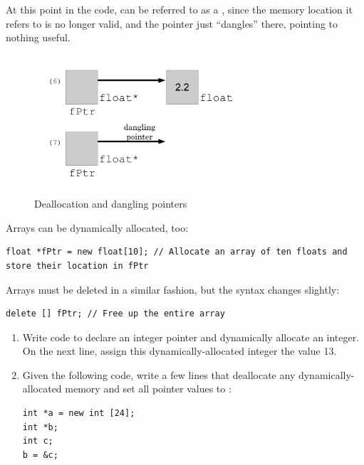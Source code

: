 At this point in the code,  can be referred to as a , since the memory location it refers to is no longer valid, and the pointer just ``dangles'' there, pointing to nothing useful. 

\begin{figure}[tbh]
  \centering
  \includegraphics[width=0.7\textwidth]{diagrams/new_operator_diagram_3.pdf}
  \caption{Deallocation and dangling pointers} \label{fig:new_operator_diagram_3} 
\end{figure}
Arrays can be dynamically allocated, too:

\noindent\begin{minipage}{\linewidth}\begin{lstlisting}
float *fPtr = new float[10]; // Allocate an array of ten floats and store their location in fPtr
\end{lstlisting}\end{minipage}

Arrays must be deleted in a similar fashion, but the syntax changes slightly:

\noindent\begin{minipage}{\linewidth}\begin{lstlisting}
delete [] fPtr; // Free up the entire array
\end{lstlisting}\end{minipage}



\begin{enumerate}
	\item Write code to declare an integer pointer and dynamically allocate an integer. On the next line, assign this dynamically-allocated integer the value 13.

  \item Given the following code, write a few lines that deallocate any dynamically-allocated memory and set all pointer values to :

\noindent\begin{minipage}{\linewidth}\begin{lstlisting}
int *a = new int [24];
int *b;
int c;
b = &c;
\end{lstlisting}\end{minipage}


\end{enumerate}

